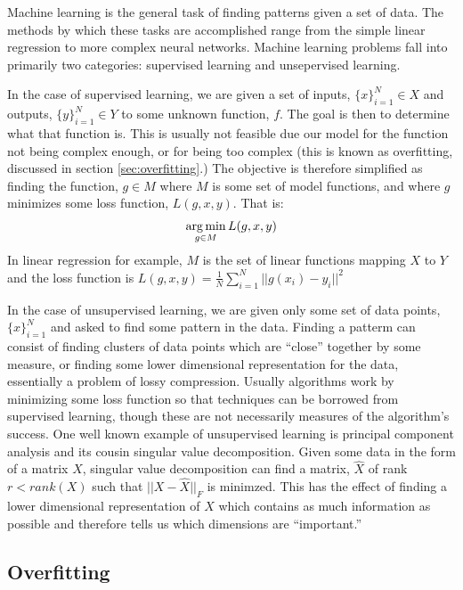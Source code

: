 Machine learning is the general task of finding patterns given a set of data.  The methods by which these tasks are accomplished range from the simple linear regression to more complex neural networks.  Machine learning problems fall into primarily two categories: supervised learning and unsepervised learning.  

In the case of supervised learning, we are given a set of inputs, $\{x\}_{i=1}^N\in X$ and outputs, $\{y\}_{i=1}^N\in Y$ to some unknown function, $f$.  The goal is then to determine what that function is.  This is usually not feasible due our model for the function not being complex enough, or for being too complex (this is known as overfitting, discussed in section \ref{sec:overfitting}.)  The objective is therefore simplified as finding the function, $g \in M$ where $M$ is some set of model functions, and where $g$ minimizes some loss function, $L(g,x,y)$.  That is:
\begin{align}
\operatorname*{arg\,min}_{g \in M} L(g,x,y)
\end{align}
In linear regression for example, $M$ is the set of linear functions mapping $X$ to $Y$and the loss function is $L(g,x,y) = \frac{1}{N} \sum_{i=1}^N ||g(x_i)-y_i||^2$

In the case of unsupervised learning, we are given only some set of data points, $\{x\}_{i=1}^N$ and asked to find some pattern in the data.  Finding a patterm can consist of finding clusters of data points which are ``close'' together by some measure, or finding some lower dimensional representation for the data, essentially a problem of lossy compression.  Usually algorithms work by minimizing some loss function so that techniques can be borrowed from supervised learning, though these are not necessarily measures of the algorithm's success.  One well known example of unsupervised learning is principal component analysis and its cousin singular value decomposition.  Given some data in the form of a matrix $X$, singular value decomposition can find a matrix, $\hat{X}$ of rank $r < rank(X)$ such that $||X-\hat{X}||_F$ is minimzed.  This has the effect of finding a lower dimensional representation of $X$ which contains as much information as possible and therefore tells us which dimensions are ``important.''

\subsection{Overfitting}
